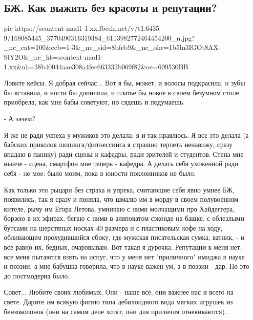  
 
 
 
 

\subsection{БЖ. Как выжить без красоты и репутации?}
\label{sec:02_04_2021.fb.bilchenko_evgenia.1.krasota_reputacia_zhizn}


\ifcmt
  pic https://scontent-mad1-1.xx.fbcdn.net/v/t1.6435-9/168085445_3770490316319384_6113982772464454200_n.jpg?_nc_cat=100&ccb=1-3&_nc_sid=8bfeb9&_nc_ohc=1b5ln3IGOt8AX-SlY2O&_nc_ht=scontent-mad1-1.xx&oh=38b40044aae308a4fec663332b069f82&oe=609530BB
\fi

Ловите кейсы. Я добрая сейчас... Вот я бы, может, и волосы подкрасила, и зубы
бы вставила, и ногти бы допилила, и платье бы новое в своем безумном стиле
приобрела, как мне бабы советуют, но сядешь и подумаешь:

- А зачем?

Я же не ради успеха у мужиков это делала: я и так нравлюсь. Я все это делала (а
бабских приколов шопинга/фитнессинга я страшно терпеть ненавижу, сразу впадаю в
панику) ради сцены и кафедры, ради зрителей и студентов. Стена мне нынче -
сцена, смартфон мне теперь - кафедра. А делать себя ухоженной ради себя - не
мое: было моим, пока в юности поклонников не было. 

Как только эти рыцари без страха и упрека, считающие себя явно умнее БЖ,
появились, так я сразу и поняла, что шмалю им в морду в своем полувоенном
кителе, рычу им Егора Летова, умничаю с ними молчащими про Хайдеггера, борзею в
их эфирах, бегаю с ними в аляповатом сэконде на башке, с облезлыми бутсами на
шерстяных носках 40 размера и с пластиковым кофе на ходу, обливающем
прохудившийся сбоку, где мужская писательская сумка, ватник, - и все равно их,
бедных, очаровываю. Вот такая я дурочка. Репутации к меня нет: все меня
пытаются взять на испуг, что у меня нет "приличного" имиджа в науке и поэзии, а
мне бабушка говорила, что в науке важен ум, а в поэзии - дар. Но это до
постмодерна было.

Совет... Любите своих любимых. Они - наше всё, они важнее нас и всего на свете.
Дарите им всякую фигню типа дебилоидного вида мягких игрушек из бензоколонок
(они на самом деле хотят, они для приличия отнекиваются).
